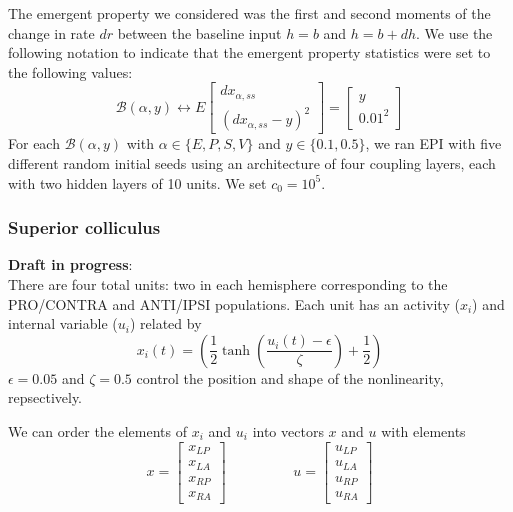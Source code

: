\documentclass[11pt]{article}
\begin{document}
The emergent property we considered was the first and second moments of the change in rate $dr$ between the baseline input $h= b$ and $h = b + dh$.  We use the following notation to indicate that the emergent property statistics were set to the following values:
\begin{equation}
\mathcal{B}(\alpha, y) \leftrightarrow 
E \begin{bmatrix} dx_{\alpha,ss} \\ (dx_{\alpha,ss} - y)^2 \end{bmatrix} = \begin{bmatrix} y \\ 0.01^2 \end{bmatrix}
\end{equation}
For each $\mathcal{B}(\alpha, y)$ with $\alpha \in \{E, P, S, V\}$ and $y \in \{0.1, 0.5\}$, we ran EPI with five different random initial seeds using an architecture of four coupling layers, each with two hidden layers of 10 units.  We set $c_0 = 10^5$.

\subsubsection{Superior colliculus}\label{methods_SC}
\textbf{Draft in progress}: \\
There are four total units: two in each hemisphere corresponding to the PRO/CONTRA and ANTI/IPSI populations.  Each unit has an activity ($x_i$) and internal variable ($u_i$) related by
\begin{equation}
x_i(t) =\left(\frac{1}{2}\tanh\left(\frac{u_i(t) - \epsilon}{\zeta}\right)+ \frac{1}{2} \right)
\end{equation}
$\epsilon = 0.05$ and $\zeta = 0.5$ control the position and shape of the nonlinearity, repsectively.

We can order the elements of $x_i$ and $u_i$ into vectors $x$ and $u$ with elements
\begin{equation}
x = \begin{bmatrix} x_{LP} \\ x_{LA} \\ x_{RP} \\ x_{RA} \end{bmatrix} \hspace{2cm} u = \begin{bmatrix} u_{LP} \\ u_{LA} \\ u_{RP} \\ u_{RA} \end{bmatrix}
\end{equation}
\end{document}
